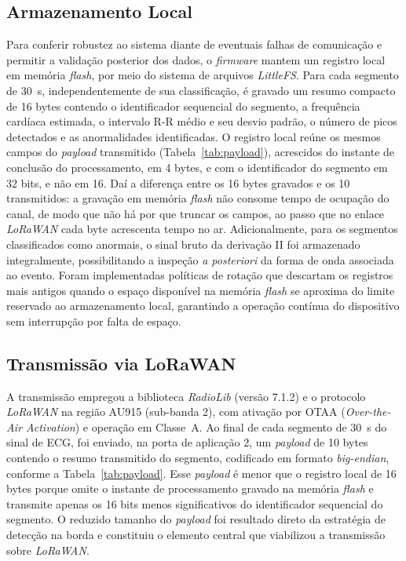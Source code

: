 \subsection{Armazenamento Local}
\label{sec:armazenamento}

Para conferir robustez ao sistema diante de eventuais falhas de comunicação e permitir a validação posterior dos dados, o \textit{firmware} mantem um registro local em memória \textit{flash}, por meio do sistema de arquivos \textit{LittleFS}. Para cada segmento de 30~s, independentemente de sua classificação, é gravado um resumo compacto de 16 bytes contendo o identificador sequencial do segmento, a frequência cardíaca estimada, o intervalo R-R médio e seu desvio padrão, o número de picos detectados e as anormalidades identificadas. O registro local reúne os mesmos campos do \textit{payload} transmitido (Tabela~\ref{tab:payload}), acrescidos do instante de conclusão do processamento, em 4 bytes, e com o identificador do segmento em 32 bits, e não em 16. Daí a diferença entre os 16 bytes gravados e os 10 transmitidos: a gravação em memória \textit{flash} não consome tempo de ocupação do canal, de modo que não há por que truncar os campos, ao passo que no enlace \textit{LoRaWAN} cada byte acrescenta tempo no ar. Adicionalmente, para os segmentos classificados como anormais, o sinal bruto da derivação II foi armazenado integralmente, possibilitando a inspeção \textit{a posteriori} da forma de onda associada ao evento. Foram implementadas políticas de rotação que descartam os registros mais antigos quando o espaço disponível na memória \textit{flash} se aproxima do limite reservado ao armazenamento local, garantindo a operação contínua do dispositivo sem interrupção por falta de espaço.

\subsection{Transmissão via LoRaWAN}
\label{sec:transmissaoFirmware}
\label{sec:transmissaoLora}

A transmissão empregou a biblioteca \textit{RadioLib} (versão 7.1.2) e o protocolo \textit{LoRaWAN} na região AU915 (sub-banda 2), com ativação por \acs{OTAA} (\textit{Over-the-Air Activation}) e operação em Classe~A. Ao final de cada segmento de 30~s do sinal de \acs{ECG}, foi enviado, na porta de aplicação 2, um \textit{payload} de 10 bytes contendo o resumo transmitido do segmento, codificado em formato \textit{big-endian}, conforme a Tabela~\ref{tab:payload}. Esse \textit{payload} é menor que o registro local de 16 bytes porque omite o instante de processamento gravado na memória \textit{flash} e transmite apenas os 16 bits menos significativos do identificador sequencial do segmento. O reduzido tamanho do \textit{payload} foi resultado direto da estratégia de detecção na borda e constituiu o elemento central que viabilizou a transmissão sobre \textit{LoRaWAN}.

